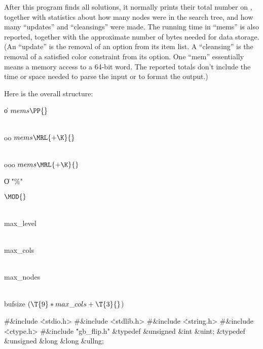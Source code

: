 \fi

After this program finds all solutions, it normally prints their total
number on , together with statistics about how many
nodes were in the search tree, and how many ``updates'' and
``cleansings'' were made.
The running time in ``mems'' is also reported, together with the approximate
number of bytes needed for data storage.
(An ``update'' is the removal of an option from its item list.
A ``cleansing'' is the removal of a satisfied color constraint from its option.
One ``mem'' essentially means a memory access to a 64-bit word.
The reported totals don't include the time or space needed to parse the
input or to format the output.)

Here is the overall structure:

\Y\B\4\D\|o\5
$\\{mems}\PP{}$\par
\B\4\D\\{oo}\5
$\\{mems}\MRL{+{\K}}{}$\par
\B\4\D\\{ooo}\5
$\\{mems}\MRL{+{\K}}{}$\par
\B\4\D\|O\5
\.{"\%"}\par
\B\4\D\Xmod\5
$\MOD{}$\par
\B\4\D\\{max\_level}\5
\par
\B\4\D\\{max\_cols}\5
\par
\B\4\D\\{max\_nodes}\5
\par
\B\4\D\\{bufsize}\5
$(\T{9}*\\{max\_cols}+\T{3}{}$)%
\par
\Y\B\8\#\&{include} \.{<stdio.h>}\6
\8\#\&{include} \.{<stdlib.h>}\6
\8\#\&{include} \.{<string.h>}\6
\8\#\&{include} \.{<ctype.h>}\6
\8\#\&{include} \.{"gb\_flip.h"}\6
\&{typedef} \&{unsigned} \&{int} \&{uint};\6
\&{typedef} \&{unsigned} \&{long} \&{long} \&{ullng};\7
